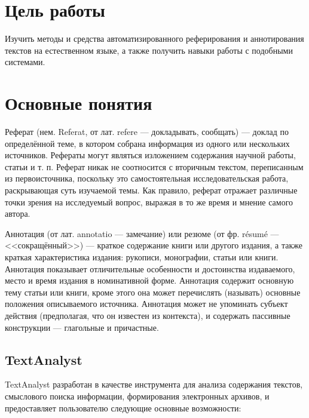 	\section{Цель работы}
		Изучить методы и средства автоматизированного реферирования и аннотирования текстов на естественном языке, а также получить навыки работы с подобными системами.
	\section{Основные понятия}
	
	Реферат (нем. Referat, от лат. refere — докладывать, сообщать) — доклад по определённой теме, в котором собрана информация из одного или нескольких источников. 
	Рефераты могут являться изложением содержания научной работы, статьи и т. п. 
	Реферат никак не соотносится с вторичным текстом, переписанным из первоисточника, поскольку это самостоятельная исследовательская работа, раскрывающая суть изучаемой темы. 
	Как правило, реферат отражает различные точки зрения на исследуемый вопрос, выражая в то же время и мнение самого автора.
	
	Аннотация (от лат. annotatio — замечание) или резюме (от фр. résumé — <<сокращённый>>) — краткое содержание книги или другого издания, а также краткая характеристика издания: рукописи, монографии, статьи или книги. 
	Аннотация показывает отличительные особенности и достоинства издаваемого, место и время издания в номинативной форме. 
	Аннотация содержит основную тему статьи или книги, кроме этого она может перечислять (называть) основные положения описываемого источника. 
	Аннотация может не упоминать субъект действия (предполагая, что он известен из контекста), и содержать пассивные конструкции — глагольные и причастные.
	
	\subsection{TextAnalyst}
	TextAnalyst разработан в качестве инструмента для анализа содержания текстов, смыслового поиска информации, формирования электронных архивов, и предоставляет пользователю следующие основные возможности: 
	
